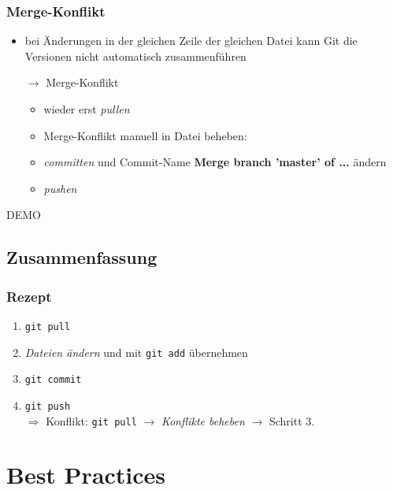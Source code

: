 \documentclass[accentcolor=tud8b,colorbacktitle,inverttitle,landscape,german,presentation,t]{tudbeamer}
\begin{document}
			\begin{frame}
				\frametitle{Merge-Konflikt}
					\begin{itemize}
						\item bei Änderungen in der gleichen Zeile der gleichen Datei kann Git die Versionen nicht automatisch zusammenführen
						\item[$\rightarrow$] Merge-Konflikt
						\begin{itemize}
							\item wieder erst \textit{pullen}
							\item Merge-Konflikt manuell in Datei beheben:\\
							
							\item \textit{committen} und Commit-Name \textbf{Merge branch 'master' of  ...} ändern
							\item \textit{pushen}
						\end{itemize}
					\end{itemize}
				
			\end{frame}
			
			\begin{frame}
				DEMO
			\end{frame}
		
	\subsection{Zusammenfassung}
		\begin{frame}
		\frametitle{Rezept}
			\begin{enumerate}
				\item \texttt{git pull}
				\item \textit{Dateien ändern} und mit \texttt{git add} übernehmen
				\item \texttt{git commit}
				\item \texttt{git push}\\
				$\Rightarrow$ Konflikt: \texttt{git pull} $\rightarrow$ \textit{Konflikte beheben} $\rightarrow$ Schritt 3.
				
			\end{enumerate}
		\end{frame}
		
	\section{Best Practices}
\end{document}
